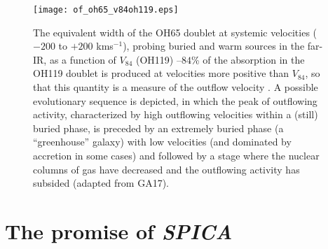 \documentclass{pasa}%
\newcommand{\kms}{{\hbox {km\thinspace s$^{-1}$}}}
\begin{document}
\begin{figure}
\begin{center}
\texttt{[image: of\_oh65\_v84oh119.eps]}
\caption{The equivalent width of the OH65 doublet at systemic velocities
  ($-200$ to $+200$ \kms), probing buried and warm sources in the far-IR, as a
  function of $V_{84}$ (OH119) --$84$\% of the absorption in the OH119 doublet
  is produced at velocities more positive than $V_{84}$, so that this quantity
  is a measure of the outflow velocity \citep{vei13}. A possible
  evolutionary sequence is depicted, in which the peak of outflowing activity,
  characterized by high outflowing velocities within a (still) buried phase,
  is preceded by an extremely buried phase (a ``greenhouse'' galaxy) with low
  velocities (and dominated by accretion in some cases) and followed by a
  stage where the nuclear columns of gas have decreased and the outflowing
  activity has subsided (adapted from GA17). 
} 
\label{oh65_local}
\end{center}
\end{figure}

 

\section{The promise of {\it SPICA}}
\end{document}
